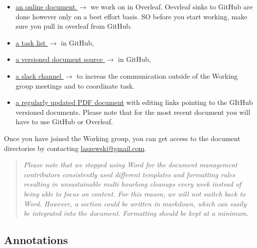 \begin{itemize}

\item
  \href{https://www.overleaf.com/project/619ba513e4aade4400e06df8}{an
    online document $\rightarrow$} we work on in Overleaf. Oevrleaf
  sinks to GitHub are done however only on a best effort basis. SO
  before you start working, make sure you pull in overleaf from
  GitHub.

\item \href{https://github.com/cyberaide/NIST-analytics/projects/1}{a task list
  $\rightarrow$} in GitHub,

\item \href{https://github.com/orgs/cyberaide/}{a versioned document
  source $\rightarrow$} in GitHub,

\item \href{https://nist-analytics.slack.com}{a slack channel
  $\rightarrow$} to increas the communication outside of the Working
  group meetings and to coordinate task.

\item
  \href{https://github.com/cyberaide/NIST-analytics/raw/main/NIST-analytics.pdf}{a
    regularly updated PDF document} with editing links pointing to the
  GItHub versioned documents. Please note that for the most recent
  document you will have to use GitHub or Overleaf. 
  
\end{itemize}

Once you have joined the Working group, you can get access to the
document directories by contacting \href{mailto:laszewski@gmail.com}{laszewski@gmail.com}.

\begin{quote}

{\em Please note that we stopped using Word for the document
  management contributors consistently used different templates and
  formatting rules resulting in unsustainable multi hourlong cleanups
  every week instead of being able to focus on content. For this
  reason, we will not switch back to Word. However, a section could be
  written in markdown, which can easily be integrated into the
  document. Formatting should be kept at a minimum.}

\end{quote}


\subsection*{Annotations}

